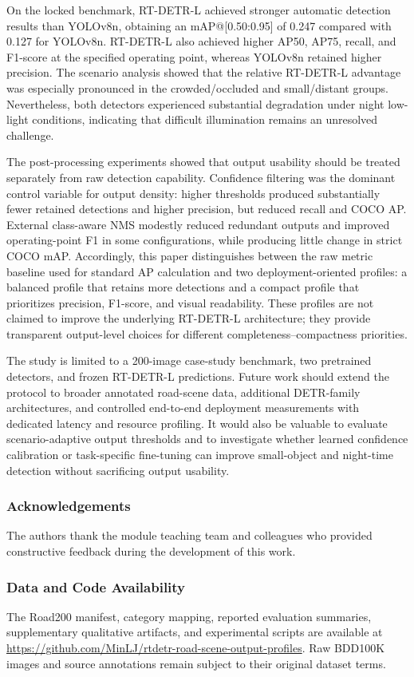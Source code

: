 \documentclass[runningheads]{llncs}
\begin{document}
On the locked benchmark, RT-DETR-L achieved stronger automatic detection results than YOLOv8n, obtaining an mAP@[0.50:0.95] of 0.247 compared with 0.127 for YOLOv8n. RT-DETR-L also achieved higher AP50, AP75, recall, and F1-score at the specified operating point, whereas YOLOv8n retained higher precision. The scenario analysis showed that the relative RT-DETR-L advantage was especially pronounced in the crowded/occluded and small/distant groups. Nevertheless, both detectors experienced substantial degradation under night low-light conditions, indicating that difficult illumination remains an unresolved challenge.

The post-processing experiments showed that output usability should be treated separately from raw detection capability. Confidence filtering was the dominant control variable for output density: higher thresholds produced substantially fewer retained detections and higher precision, but reduced recall and COCO AP. External class-aware NMS modestly reduced redundant outputs and improved operating-point F1 in some configurations, while producing little change in strict COCO mAP. Accordingly, this paper distinguishes between the raw metric baseline used for standard AP calculation and two deployment-oriented profiles: a balanced profile that retains more detections and a compact profile that prioritizes precision, F1-score, and visual readability. These profiles are not claimed to improve the underlying RT-DETR-L architecture; they provide transparent output-level choices for different completeness--compactness priorities.

The study is limited to a 200-image case-study benchmark, two pretrained detectors, and frozen RT-DETR-L predictions. Future work should extend the protocol to broader annotated road-scene data, additional DETR-family architectures, and controlled end-to-end deployment measurements with dedicated latency and resource profiling. It would also be valuable to evaluate scenario-adaptive output thresholds and to investigate whether learned confidence calibration or task-specific fine-tuning can improve small-object and night-time detection without sacrificing output usability.

\subsubsection*{Acknowledgements}
The authors thank the module teaching team and colleagues who provided constructive feedback during the development of this work.

\subsubsection*{Data and Code Availability}
The Road200 manifest, category mapping, reported evaluation summaries, supplementary qualitative artifacts, and experimental scripts are available at \url{https://github.com/MinLJ/rtdetr-road-scene-output-profiles}. Raw BDD100K images and source annotations remain subject to their original dataset terms.



\end{document}
